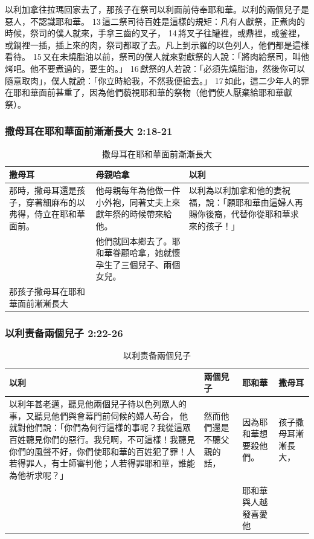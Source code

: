 以利加拿往拉瑪回家去了，那孩子在祭司以利面前侍奉耶和華。以利的兩個兒子是惡人，不認識耶和華。 13 這二祭司待百姓是這樣的規矩：凡有人獻祭，正煮肉的時候，祭司的僕人就來，手拿三齒的叉子， 14 將叉子往罐裡，或鼎裡，或釜裡，或鍋裡一插，插上來的肉，祭司都取了去。凡上到示羅的以色列人，他們都是這樣看待。 15 又在未燒脂油以前，祭司的僕人就來對獻祭的人說：「將肉給祭司，叫他烤吧。他不要煮過的，要生的。」 16 獻祭的人若說：「必須先燒脂油，然後你可以隨意取肉」，僕人就說：「你立時給我，不然我便搶去。」 17 如此，這二少年人的罪在耶和華面前甚重了，因為他們藐視耶和華的祭物（他們使人厭棄給耶和華獻祭）。

\subsubsection{撒母耳在耶和華面前漸漸長大 2:18-21}
\begin{table}[H]
\centering
\begin{tabular}{p{5.7cm}|p{5.8cm}|p{5.3cm}}\hline
撒母耳&母親哈拿&以利\\\hline
那時，撒母耳還是孩子，穿著細麻布的以弗得，侍立在耶和華面前。
&他母親每年為他做一件小外袍，同著丈夫上來獻年祭的時候帶來給他。
&以利為以利加拿和他的妻祝福，說：「願耶和華由這婦人再賜你後裔，代替你從耶和華求來的孩子！」\\\hline
&他們就回本鄉去了。耶和華眷顧哈拿，她就懷孕生了三個兒子、兩個女兒。&\\\hline
那孩子撒母耳在耶和華面前漸漸長大&&\\\hline
\end{tabular}
\caption{撒母耳在耶和華面前漸漸長大}
\end{table}  


\subsubsection{以利责备兩個兒子 2:22-26}
\begin{table}[H]
\centering
\begin{tabular}{p{9.7cm}|p{1.5cm}|p{3.7cm}|p{1.2cm}}\hline
以利&兩個兒子&耶和華&撒母耳\\\hline
以利年甚老邁，聽見他兩個兒子待以色列眾人的事，又聽見他們與會幕門前伺候的婦人苟合， 他就對他們說：「你們為何行這樣的事呢？我從這眾百姓聽見你們的惡行。我兒啊，不可這樣！我聽見你們的風聲不好，你們使耶和華的百姓犯了罪！人若得罪人，有士師審判他；人若得罪耶和華，誰能為他祈求呢？」
&然而他們還是不聽父親的話，
&因為耶和華想要殺他們。
&孩子撒母耳漸漸長大，\\\hline
& &耶和華與人越發喜愛他&\\\hline
\end{tabular}
\caption{以利责备兩個兒子}
\end{table}  



